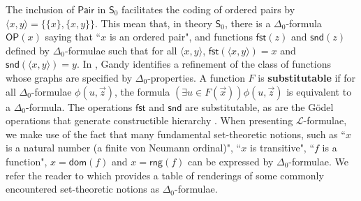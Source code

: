 \documentclass[11pt, a4paper]{article}
\begin{document}
The inclusion of $\textsf{Pair}$ in $\mathsf{S}_0$ facilitates the coding of ordered pairs by $\langle x, y \rangle= \{ \{x\}, \{x, y\}\}$. This mean that, in theory $\mathsf{S}_0$, there is a $\Delta_0$-formula $\mathsf{OP}(x)$ saying that ``$x$ is an ordered pair", and functions $\mathsf{fst}(z)$ and $\mathsf{snd}(z)$ defined by $\Delta_0$-formulae such that for all $\langle x, y \rangle$, $\mathsf{fst}(\langle x, y \rangle)=x$ and $\mathsf{snd}(\langle x, y \rangle)= y$. In \cite{gan74}, Gandy identifies a refinement of the class of functions whose graphs are specified by $\Delta_0$-properties. A function $F$ is {\bf substitutable} if for all $\Delta_0$-formulae $\phi(u, \vec{z})$, the formula $(\exists u \in F(\vec{x}))\phi(u, \vec{z})$ is equivalent to a $\Delta_0$-formula. The operations $\mathsf{fst}$ and $\mathsf{snd}$ are substitutable, as are the G\"{o}del operations that generate constructible hierarchy \cite{gan74}. When presenting $\mathcal{L}$-formulae, we make use of the fact that many fundamental set-theoretic notions, such as ``$x$ is a natural number (a finite von Neumann ordinal)", ``$x$ is transitive", ``$f$ is a function", $x= \mathsf{dom}(f)$ and $x= \mathsf{rng}(f)$ can be expressed by $\Delta_0$-formulae. We refer the reader to \cite[Table 1 on p.14]{bar75} which provides a table of renderings of some commonly encountered set-theoretic notions as $\Delta_0$-formulae. 
\end{document}

